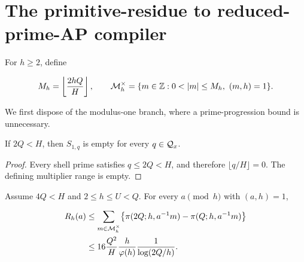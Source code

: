 \section{The primitive-residue to reduced-prime-AP compiler}
\label{sec:compiler}

For $h\geq2$, define

\begin{equation}
 M_h=\left\lfloor\frac{2hQ}{H}\right\rfloor,
 \qquad
 \Mh=\{m\in\ZZ:0<|m|\leq M_h,\ (m,h)=1\}.
 \label{eq:Mh}
\end{equation}

We first dispose of the modulus-one branch, where a prime-progression bound is
unnecessary.

\begin{lemma}
\label{lem:h-one}
If $2Q<H$, then $S_{1,q}$ is empty for every $q\in\mathcal Q_x$.
\end{lemma}

\begin{proof}
Every shell prime satisfies $q\leq2Q<H$, and therefore
$\lfloor q/H\rfloor=0$.  The defining multiplier range is empty.
\end{proof}

\begin{theorem}
\label{thm:bucket}
Assume $4Q<H$ and $2\leq h\leq U<Q$.  For every
$a\pmod h$ with $(a,h)=1$,

\begin{align}
 R_h(a)
 &\leq\sum_{m\in\mathcal M_h^{\times}}
 \bigl\{\pi(2Q;h,a^{-1}m)-\pi(Q;h,a^{-1}m)\bigr\}
 \label{eq:ap-census}\\
 &\leq16\frac{Q^2}{H}\frac{h}{\varphi(h)}
 \frac{1}{\log(2Q/h)}.
 \label{eq:factor16}
\end{align}
\end{theorem}

